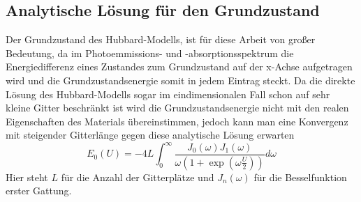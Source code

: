 \subsection{Analytische Lösung für den Grundzustand}
Der Grundzustand des Hubbard-Modells, ist für diese Arbeit von großer Bedeutung, da im Photoemmissions- und -absorptionsspektrum die Energiedifferenz eines Zustandes zum Grundzustand auf der x-Achse aufgetragen wird und die Grundzustandsenergie somit in jedem Eintrag steckt. Da die direkte Lösung des Hubbard-Modells sogar im eindimensionalen Fall schon auf sehr kleine Gitter beschränkt ist wird die Grundzustandsenergie nicht mit den realen Eigenschaften des Materials übereinstimmen, jedoch kann man eine Konvergenz mit steigender Gitterlänge gegen diese analytische Lösung erwarten
\begin{equation}\label{analytisch}
E_0(U)=-4L\int_{0}^{\infty}\frac{J_0(\omega)J_1(\omega)}{\omega\left( 1+\exp\left( \omega\frac{U}{2}\right) \right) }d\omega
\end{equation}\cite{Monien}
Hier steht $ L $ für die Anzahl der Gitterplätze und $ J_n(\omega) $ für die Besselfunktion erster Gattung.



